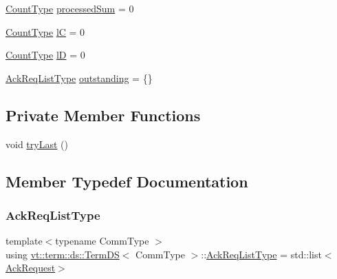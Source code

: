 \begin{DoxyCompactItemize}
\item 
\hyperlink{structvt_1_1term_1_1ds_1_1_term_d_s_a54f4ebd7e1ecb59c32c0f5b03ef9f20b}{Count\+Type} \hyperlink{structvt_1_1term_1_1ds_1_1_term_d_s_ad82335b84b7ac759e94fa524c59b03d9}{processed\+Sum} = 0
\item 
\hyperlink{structvt_1_1term_1_1ds_1_1_term_d_s_a54f4ebd7e1ecb59c32c0f5b03ef9f20b}{Count\+Type} \hyperlink{structvt_1_1term_1_1ds_1_1_term_d_s_a7b24d9eb35f71de23824ea8434a52cfd}{lC} = 0
\item 
\hyperlink{structvt_1_1term_1_1ds_1_1_term_d_s_a54f4ebd7e1ecb59c32c0f5b03ef9f20b}{Count\+Type} \hyperlink{structvt_1_1term_1_1ds_1_1_term_d_s_acd01a2b3778d0510fe35f6497f33eda9}{lD} = 0
\item 
\hyperlink{structvt_1_1term_1_1ds_1_1_term_d_s_a9d4102aa0577c3b077befc48c1a88842}{Ack\+Req\+List\+Type} \hyperlink{structvt_1_1term_1_1ds_1_1_term_d_s_a345a64aa827f72e541f9725f7ea2cbf8}{outstanding} = \{\}
\end{DoxyCompactItemize}
\subsection*{Private Member Functions}
\begin{DoxyCompactItemize}
\item 
void \hyperlink{structvt_1_1term_1_1ds_1_1_term_d_s_ae568c3c351a353e9ca04764957b5b642}{try\+Last} ()
\end{DoxyCompactItemize}


\subsection{Member Typedef Documentation}
\mbox{\label{structvt_1_1term_1_1ds_1_1_term_d_s_a9d4102aa0577c3b077befc48c1a88842}} 
\subsubsection{\texorpdfstring{Ack\+Req\+List\+Type}{AckReqListType}}
{\footnotesize\ttfamily template$<$typename Comm\+Type $>$ \\
using \hyperlink{structvt_1_1term_1_1ds_1_1_term_d_s}{vt\+::term\+::ds\+::\+Term\+DS}$<$ Comm\+Type $>$\+::\hyperlink{structvt_1_1term_1_1ds_1_1_term_d_s_a9d4102aa0577c3b077befc48c1a88842}{Ack\+Req\+List\+Type} =  std\+::list$<$\hyperlink{structvt_1_1term_1_1ds_1_1_ack_request}{Ack\+Request}$>$}

